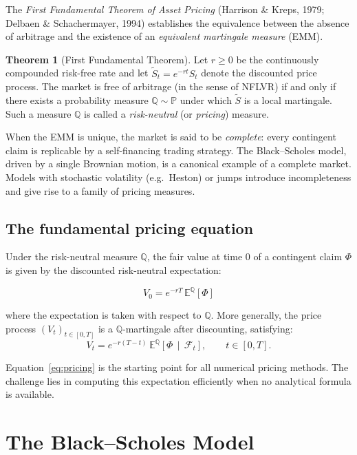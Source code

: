 \documentclass[12pt, a4paper]{report}
\theoremstyle{definition}
\newtheorem{theorem}{Theorem}[chapter]
\newcommand{\EQ}{\mathbb{E}^{\mathbb{Q}}}
\newcommand{\Q}{\mathbb{Q}}
\newcommand{\F}{\mathcal{F}}
\begin{document}
The \emph{First Fundamental Theorem of Asset Pricing} (Harrison \&
Kreps, 1979; Delbaen \& Schachermayer, 1994) establishes the equivalence
between the absence of arbitrage and the existence of an \emph{equivalent
martingale measure} (EMM).

\begin{theorem}[First Fundamental Theorem]
Let $r \geq 0$ be the continuously compounded risk-free rate and let
$\tilde{S}_t = e^{-rt}S_t$ denote the discounted price process.  The
market is free of arbitrage (in the sense of NFLVR) if and only if there
exists a probability measure $\Q \sim \mathbb{P}$ under which
$\tilde{S}$ is a local martingale.  Such a measure $\Q$ is called a
\emph{risk-neutral} (or \emph{pricing}) measure.
\end{theorem}

When the EMM is unique, the market is said to be \emph{complete}: every
contingent claim is replicable by a self-financing trading strategy.  The
Black--Scholes model, driven by a single Brownian motion, is a canonical
example of a complete market.  Models with stochastic volatility (e.g.\
Heston) or jumps introduce incompleteness and give rise to a family of
pricing measures.

\subsection{The fundamental pricing equation}

Under the risk-neutral measure $\Q$, the fair value at time $0$ of a
contingent claim $\Phi$ is given by the discounted risk-neutral
expectation:

\begin{equation}
  \boxed{V_0 = e^{-rT}\,\EQ\!\left[\Phi\right]}
  \label{eq:pricing}
\end{equation}

\noindent where the expectation is taken with respect to $\Q$.  More
generally, the price process $(V_t)_{t \in [0,T]}$ is a
$\Q$-martingale after discounting, satisfying:
\[
  V_t = e^{-r(T-t)}\,\EQ\!\left[\Phi \,\middle|\, \F_t\right],
  \qquad t \in [0,T].
\]

Equation~\eqref{eq:pricing} is the starting point for all numerical
pricing methods.  The challenge lies in computing this expectation
efficiently when no analytical formula is available.

\section{The Black--Scholes Model}
\end{document}
